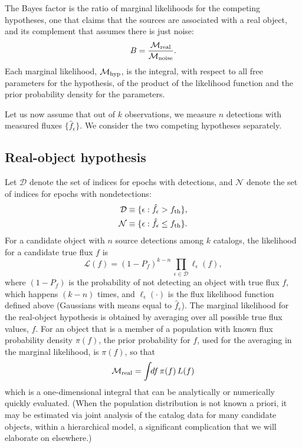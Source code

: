 \documentclass[twocolumn]{emulateapj}
\newcommand{\eind}{\epsilon}  %
\newcommand{\like}{\mathcal{L}}  %
\newcommand{\flike}{\ell}  %
\newcommand{\mlike}{\mathcal{M}}  %
\newcommand{\flux}{f}
\newcommand{\fest}{\hat{\flux}}  %
\newcommand{\dtxn}{\mathcal{D}}  %
\newcommand{\ndtxn}{\mathcal{N}}  %
\newcommand{\fth}{\flux_{\rm th}}
\begin{document}
The Bayes factor is the ratio of marginal likelihoods for the competing hypotheses, one that claims that the sources are associated with a real object, and its complement that assumes there is just noise:
%
\begin{equation} \label{eq:Bfac}
B = \frac{\mlike_{\rm{}real}}{\mlike_{\rm{}noise}} .
\end{equation}
%
Each marginal likelihood, $\mlike_{\rm{}hyp}$, is the integral, with respect to all free parameters for the hypothesis, of the product of the likelihood function and the prior probability density for the parameters.

Let us now assume that out of $k$ observations, we measure $n$ detections with measured fluxes $\{\fest_\eind\}$.
We consider the two competing hypotheses separately.

\subsection{Real-object hypothesis}
\noindent
Let $\dtxn$ denote the set of indices for epochs with detections, and $\ndtxn$ denote the set of indices for epochs with nondetections:
\begin{equation}
\begin{split}
\dtxn  &\equiv \{\eind : \fest_\eind > \fth\},\\
\ndtxn &\equiv \{\eind : \fest_\eind \le \fth\}.
\end{split}
\label{D-ND-sets}
\end{equation}
For a candidate object with $n$ source detections among $k$ catalogs, the likelihood for a candidate true flux $f$ is
%
\begin{equation}
\like(f) = (1\!-\!P_f)^{k-n}\,\prod_{\eind \in \dtxn} \flike_\eind(\flux),
\end{equation}
%
where \mbox{$(1\!-\!P_f)$} is the probability of not detecting an object with true flux $f$, which happens \mbox{$(k\!-\!n)$} times, and $\flike_\eind(\cdot)$ is the flux likelihood function defined above (Gaussians with means equal to $\fest_\eind$).
%
The marginal likelihood for the real-object hypothesis is obtained by averaging over all possible true flux values, $f$.
For an object that is a member of a population with known flux probability density $\pi(f)$, the prior probability for $f$, used for the averaging in the marginal likelihood, is $\pi(f)$, so that
%
\begin{equation}
\mlike_{\rm{}real} = \int\!\!df\,\pi(f)\,L(f)
\end{equation}
%
which is a one-dimensional integral that can be analytically or numerically quickly evaluated.
(When the population distribution is not known a priori, it may be estimated via joint analysis of the catalog data for many candidate objects, within a hierarchical model, a significant complication that we will elaborate on elsewhere.)
\end{document}
